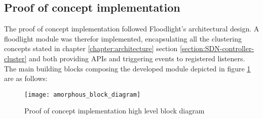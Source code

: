 \subsection{Proof of concept implementation}
\label{subsection:poc-module}
%
The proof of concept implementation followed Floodlight's architectural design.
A floodlight module was therefor implemented, encapsulating all the clustering concepts stated in chapter \ref*{chapter:architecture} section \ref{section:SDN-controller-cluster} and both providing \glspl{API} and triggering events to registered listeners.
The main building blocks composing the developed module depicted in figure \ref{fig:amorphous_block_diagram} are as follows:
%
\begin{figure}
	\centering
	\texttt{[image: amorphous\_block\_diagram]}
	\caption{Proof of concept implementation high level block diagram}
	\label{fig:amorphous_block_diagram}
\end{figure}
%
